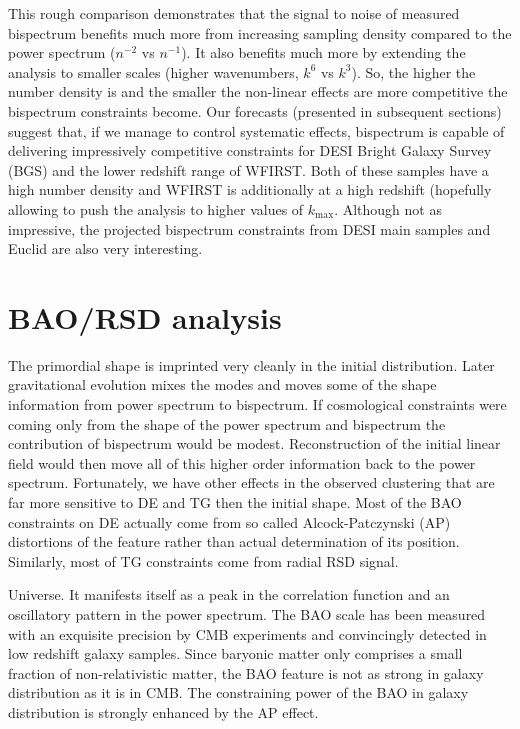 This rough comparison demonstrates that the signal to noise of measured
bispectrum benefits much more from increasing sampling density  compared to
the power spectrum ($n^{-2}$ vs $n^{-1}$). It also benefits much more by
extending the analysis to smaller scales (higher wavenumbers, $k^6$ vs
$k^3$). So, the higher the number density is and the smaller the non-linear
effects are more competitive the bispectrum constraints become. Our forecasts
(presented in subsequent sections) suggest that, if we manage to control
systematic effects, bispectrum is capable of delivering impressively
competitive constraints for DESI Bright Galaxy Survey (BGS) and the lower
redshift range of WFIRST. Both of these samples have a high number density and
WFIRST is additionally at a high redshift (hopefully allowing to push the
analysis to higher values of $k_\mathrm{max}$. Although not as impressive, the
projected bispectrum constraints from DESI main samples and Euclid are also
very interesting.

\section{BAO/RSD analysis}

The primordial shape is imprinted very cleanly in the initial distribution.
Later gravitational evolution mixes the modes and moves some of the shape
information from power spectrum to bispectrum. If cosmological constraints
were coming only from the shape of the power spectrum and bispectrum the
contribution of bispectrum  would be modest. Reconstruction of the initial
linear field would then move all of this higher order information back to the
power spectrum. Fortunately, we have other effects in the observed clustering
that are far more sensitive to DE and TG then the initial shape. Most of the
BAO constraints on DE actually come from so called Alcock-Patczynski (AP)
distortions of the feature rather than actual determination of its position.
Similarly, most of TG constraints come from radial RSD signal.

Universe. It manifests itself as a peak in the correlation function and an
oscillatory pattern in the power spectrum. The BAO scale has been measured
with an exquisite precision by CMB experiments and convincingly detected in
low redshift galaxy samples. Since baryonic matter only comprises a small
fraction of non-relativistic matter, the BAO feature is not as strong in
galaxy distribution as it is in CMB. The constraining power of the BAO in
galaxy distribution is strongly enhanced by the AP effect.


